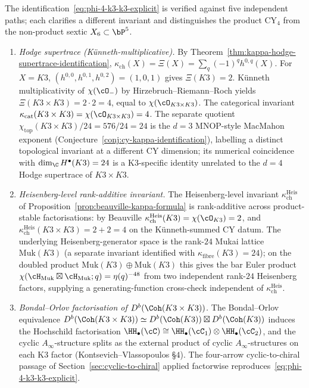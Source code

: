 \begin{remark}
\label{rem:phi-4-k3-k3-verification}
%
The identification~\eqref{eq:phi-4-k3-k3-explicit} is verified against five independent paths; each clarifies a different invariant and distinguishes the product CY$_4$ from the non-product sextic $X_6 \subset \bP^5$.

\begin{enumerate}[label=\textup{(V\arabic*)}]
\item \emph{Hodge supertrace \textup{(}K\"unneth-multiplicative\textup{).}} By Theorem~\textup{\ref{thm:kappa-hodge-supertrace-identification}}, $\kappa_{\mathrm{ch}}(X) = \Xi(X) = \sum_q (-1)^q h^{0,q}(X)$. For $X = K3$, $(h^{0,0}, h^{0,1}, h^{0,2}) = (1, 0, 1)$ gives $\Xi(K3) = 2$. K\"unneth multiplicativity of $\chi(\cO_{-})$ by Hirzebruch--Riemann--Roch yields $\Xi(K3 \times K3) = 2 \cdot 2 = 4$, equal to $\chi(\cO_{K3 \times K3})$. The categorical invariant $\kappa_{\mathrm{cat}}(K3 \times K3) = \chi(\cO_{K3 \times K3}) = 4$. The separate quotient $\chi_{\mathrm{top}}(K3 \times K3)/24 = 576/24 = 24$ is the $d = 3$ MNOP-style MacMahon exponent (Conjecture~\ref{conj:cy-kappa-identification}), labelling a distinct topological invariant at a different CY dimension; its numerical coincidence with $\dim_\C H^\bullet(K3) = 24$ is a K3-specific identity unrelated to the $d = 4$ Hodge supertrace of $K3 \times K3$.

\item \emph{Heisenberg-level rank-additive invariant.} The Heisenberg-level invariant $\kappa_{\mathrm{ch}}^{\mathrm{Heis}}$ of Proposition~\textup{\ref{prop:beauville-kappa-formula}} is rank-additive across product-stable factorisations: by Beauville $\kappa_{\mathrm{ch}}^{\mathrm{Heis}}(K3) = \chi(\cO_{K3}) = 2$, and $\kappa_{\mathrm{ch}}^{\mathrm{Heis}}(K3 \times K3) = 2 + 2 = 4$ on the K\"unneth-summed CY datum. The underlying Heisenberg-generator space is the rank-$24$ Mukai lattice $\mathrm{Muk}(K3)$ (a separate invariant identified with $\kappa_{\mathrm{fibre}}(K3) = 24$); on the doubled product $\mathrm{Muk}(K3) \oplus \mathrm{Muk}(K3)$ this gives the bar Euler product $\chi(\cH_{\mathrm{Muk}} \boxtimes \cH_{\mathrm{Muk}}; q) = \eta(q)^{-48}$ from two independent rank-$24$ Heisenberg factors, supplying a generating-function cross-check independent of $\kappa_{\mathrm{ch}}^{\mathrm{Heis}}$.

\item \emph{Bondal--Orlov factorisation of $D^b(\Coh(K3 \times K3))$.} The Bondal--Orlov equivalence $D^b(\Coh(K3 \times K3)) \simeq D^b(\Coh(K3)) \boxtimes D^b(\Coh(K3))$ induces the Hochschild factorisation $\HH_\bullet(\cC) \cong \HH_\bullet(\cC_1) \otimes \HH_\bullet(\cC_2)$, and the cyclic $A_\infty$-structure splits as the external product of cyclic $A_\infty$-structures on each K$3$ factor (Kontsevich--Vlassopoulos \cite{KontsevichVlassopoulos2022} \S$4$). The four-arrow cyclic-to-chiral passage of Section~\textup{\ref{sec:cyclic-to-chiral}} applied factorwise reproduces~\eqref{eq:phi-4-k3-k3-explicit}.


\end{enumerate}
\end{remark}
